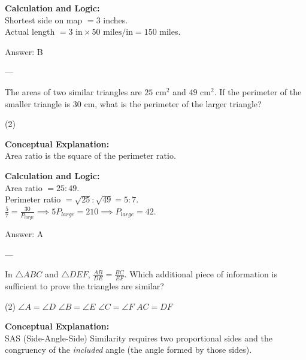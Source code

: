 \documentclass[11pt,paper=a4,answers]{exam}
\begin{document}
\begin{questions}
\begin{solution}
\vspace{10pt}
\textbf{Calculation and Logic:} \\
Shortest side on map $= 3$ inches. \\
Actual length $= 3 \text{ in} \times 50 \text{ miles/in} = 150$ miles.

\vspace{15pt}
Answer: \colorbox{yellow!100}{B}
\end{solution}

---

\question
The areas of two similar triangles are $25 \text{ cm}^2$ and $49 \text{ cm}^2$. If the perimeter of the smaller triangle is 30 cm, what is the perimeter of the larger triangle?
\begin{tasks}(2)
\end{tasks}

\begin{solution}
\textbf{Conceptual Explanation:} \\
Area ratio is the square of the perimeter ratio.

\vspace{10pt}
\textbf{Calculation and Logic:} \\
Area ratio $= 25:49$. \\
Perimeter ratio $= \sqrt{25} : \sqrt{49} = 5:7$. \\
$\frac{5}{7} = \frac{30}{P_{large}} \implies 5P_{large} = 210 \implies P_{large} = 42$.

\vspace{15pt}
Answer: \colorbox{yellow!100}{A}
\end{solution}

---

\question
In $\triangle ABC$ and $\triangle DEF$, $\frac{AB}{DE} = \frac{BC}{EF}$. Which additional piece of information is sufficient to prove the triangles are similar?
\begin{tasks}(2)
    \task $\angle A = \angle D$
    \task $\angle B = \angle E$
    \task $\angle C = \angle F$
    \task $AC = DF$
\end{tasks}

\begin{solution}
\textbf{Conceptual Explanation:} \\
SAS (Side-Angle-Side) Similarity requires two proportional sides and the congruency of the \textit{included} angle (the angle formed by those sides).


\end{solution}
\end{questions}
\end{document}
